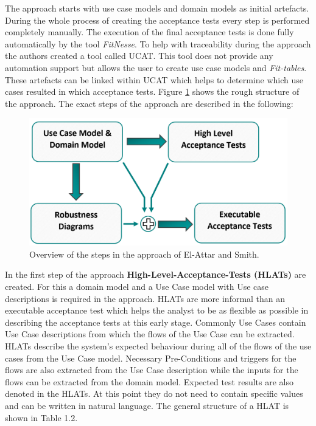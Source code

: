 The approach starts with use case models and domain models as initial artefacts.
During the whole process of creating the acceptance tests every step is performed completely manually.
The execution of the final acceptance tests is done fully automatically by the tool \textit{FitNesse}.
To help with traceability during the approach the authors created a tool called UCAT.
This tool does not provide any automation support but allows the user to create use case models and \textit{Fit-tables}.
These artefacts can be linked within UCAT which helps to determine which use cases resulted in which acceptance tests.
Figure \ref{fig:overview-el-attar} shows the rough structure of the approach.
The exact steps of the approach are described in the following:

\begin{figure}
	\centering
	\includegraphics[width=.8\textwidth]{../images/ElAttarProcess.png}
	\caption{Overview of the steps in the approach of El-Attar and Smith.}
	\label{fig:overview-el-attar}
\end{figure}

In the first step of the approach \textbf{High-Level-Acceptance-Tests (HLATs)} are created.
For this a domain model and a Use Case model with Use case descriptions is required in the approach.
HLATs are more informal than an executable acceptance test which helps the analyst to be as flexible as possible in describing the acceptance tests at this early stage.
Commonly Use Cases contain Use Case descriptions from which the flows of the Use Case can be extracted.
HLATs describe the system's expected behaviour during all of the flows of the use cases from the Use Case model.
Necessary Pre-Conditions and triggers for the flows are also extracted from the Use Case description while the inputs for the flows can be extracted from the domain model.
Expected test results are also denoted in the HLATs.
At this point they do not need to contain specific values and can be written in natural language.
The general structure of a HLAT is shown in Table 1.2.


